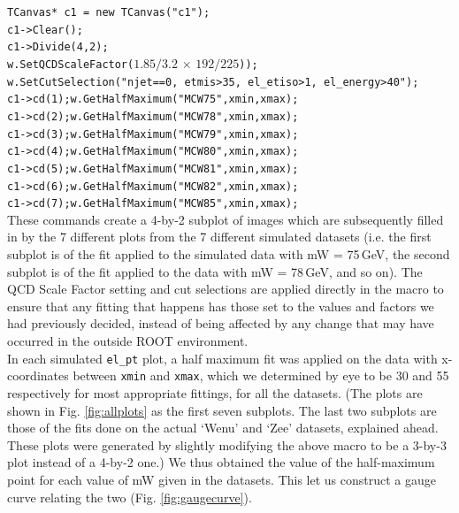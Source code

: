 \noindent \texttt{TCanvas* c1 = new TCanvas("c1");\\
c1->Clear();\\
c1->Divide(4,2);\\
w.SetQCDScaleFactor($1.85/3.2 \,\times\, 192/225$));\\
w.SetCutSelection("njet==0, etmis>35, el\_etiso>1, el\_energy>40");\\
c1->cd(1);w.GetHalfMaximum("MCW75",xmin,xmax);\\
c1->cd(2);w.GetHalfMaximum("MCW78",xmin,xmax);\\
c1->cd(3);w.GetHalfMaximum("MCW79",xmin,xmax);\\
c1->cd(4);w.GetHalfMaximum("MCW80",xmin,xmax);\\
c1->cd(5);w.GetHalfMaximum("MCW81",xmin,xmax);\\
c1->cd(6);w.GetHalfMaximum("MCW82",xmin,xmax);\\
c1->cd(7);w.GetHalfMaximum("MCW85",xmin,xmax);}\\

\noindent These commands create a 4-by-2 subplot of images which are subsequently filled in by the 7 different plots from the 7 different simulated datasets (i.e. the first subplot is of the fit applied to the simulated data with mW = 75$\,$GeV, the second subplot is of the fit applied to the data with mW = 78$\,$GeV, and so on). The QCD Scale Factor setting and cut selections are applied directly in the macro to ensure that any fitting that happens has those set to the values and factors we had previously decided, instead of being affected by any change that may have occurred in the outside ROOT environment.\\

\noindent In each simulated \texttt{el\_pt} plot, a half maximum fit was applied on the data with x-coordinates between \texttt{xmin} and \texttt{xmax}, which we determined by eye to be 30 and 55 respectively for most appropriate fittings, for all the datasets. (The plots are shown in Fig. \ref{fig:allplots} as the first seven subplots. The last two subplots are those of the fits done on the actual `Wenu' and `Zee' datasets, explained ahead. These plots were generated by slightly modifying the above macro to be a 3-by-3 plot instead of a 4-by-2 one.) We thus obtained the value of the half-maximum point for each value of mW given in the datasets. This let us construct a gauge curve relating the two (Fig. \ref{fig:gaugecurve}).

